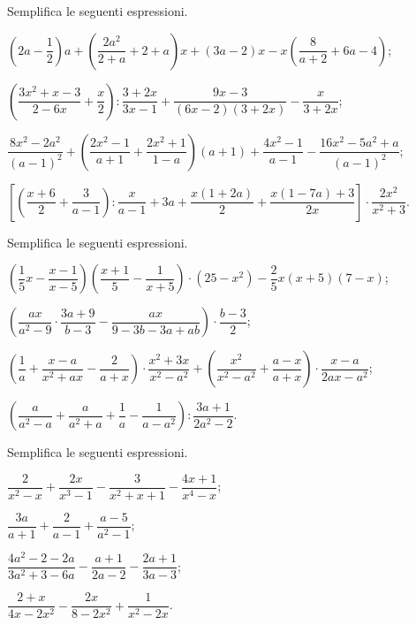 \begin{esercizio}[\Ast]
\label{ese:14.48}
Semplifica le seguenti espressioni.
\begin{enumeratea}
 \item $\left(2a-\dfrac{1}{2}\right)a+\left(\dfrac{2a^{2}}{2+a}+2+a\right)x+(3a-2)x-x\left(\dfrac{8}{a+2}+6a-4\right)$;
 \item $\left(\dfrac{3x^{2}+x-3}{2-6x}+\dfrac{x}{2}\right):\dfrac{3+2x}{3x-1}+\dfrac{9x-3}{(6x-2)(3+2x)}-\dfrac{x}{3+2x}$;
 \item $\dfrac{8x^{2}-2a^{2}}{(a-1)^{2}}+\left(\dfrac{2x^{2}-1}{a+1}+\dfrac{2x^{2}+1}{1-a}\right)(a+1)+\dfrac{4x^{2}-1}{a-1}-\dfrac{16x^{2}-5a^{2}+a}{(a-1)^{2}}$;
 \item $\left[\left(\dfrac{x+6}{2}+\dfrac{3}{a-1}\right):\dfrac{x}{a-1}+3a+\dfrac{x(1+2a)}{2}+\dfrac{x(1-7a)+3}{2x}\right]\cdot {\dfrac{2x^{2}}{x^{2}+3}}$.
\end{enumeratea}
\end{esercizio}

\begin{esercizio}[\Ast]
\label{ese:14.49}
Semplifica le seguenti espressioni.
\begin{enumeratea}
 \item $\left(\dfrac{1}{5}x-\dfrac{x-1}{x-5}\right)\left(\dfrac{x+1}{5}-\dfrac{1}{x+5}\right)\cdot (25-x^{2})-\dfrac{2}{5}x(x+5)(7-x)$;
 \item $\left(\dfrac{ax}{a^{2}-9}\cdot {\dfrac{3a+9}{b-3}}-\dfrac{ax}{9-3b-3a+ab}\right)\cdot {\dfrac{b-3}{2}}$;
 \item $\left(\dfrac{1}{a}+\dfrac{x-a}{x^{2}+ax}-\dfrac{2}{a+x}\right)\cdot {\dfrac{x^{2}+3x}{x^{2}-a^{2}}}+\left(\dfrac{x^{2}}{x^{2}-a^{2}}+\dfrac{a-x}{a+x}\right)\cdot {\dfrac{x-a}{2ax-a^{2}}}$;
 \item $\left(\dfrac{a}{a^{2}-a}+\dfrac{a}{a^{2}+a}+\dfrac{1}{a}-\dfrac{1}{a-a^{2}}\right):\dfrac{3a+1}{2a^{2}-2}$.
\end{enumeratea}
\end{esercizio}
\pagebreak
\begin{esercizio}[\Ast]
\label{ese:14.50}
Semplifica le seguenti espressioni.
\begin{multicols}{2}
\begin{enumeratea}
 \item $\dfrac{2}{x^{2}-x}+\dfrac{2x}{x^{3}-1}-\dfrac{3}{x^{2}+x+1}-\dfrac{4x+1}{x^{4}-x}$;
 \item $\dfrac{3a}{a+1}+\dfrac{2}{a-1}+\dfrac{a-5}{a^{2}-1}$;
 \item $\dfrac{4a^{2}-2-2a}{3a^{2}+3-6a}-\dfrac{a+1}{2a-2}-\dfrac{2a+1}{3a-3}$;
 \item $\dfrac{2+x}{4x-2x^{2}}-\dfrac{2x}{8-2x^{2}}+\dfrac{1}{x^{2}-2x}$.
\end{enumeratea}
\end{multicols}
\end{esercizio}

